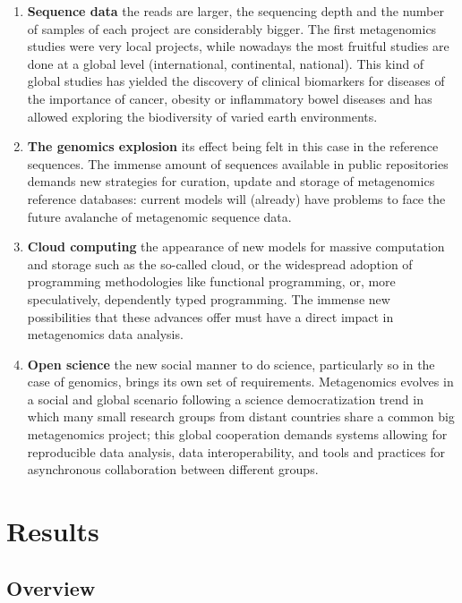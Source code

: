 \documentclass{frontiersSCNS} %
\providecommand{\tightlist}{%
\setlength{\itemsep}{0pt}\setlength{\parskip}{0pt}}
\begin{document}
\begin{enumerate}
\def\labelenumi{\roman{enumi}.}
\tightlist
\item
  \textbf{Sequence data} the reads are larger, the sequencing depth and
  the number of samples of each project are considerably bigger. The
  first metagenomics studies were very local projects, while nowadays
  the most fruitful studies are done at a global level (international,
  continental, national). This kind of global studies has yielded the
  discovery of clinical biomarkers for diseases of the importance of
  cancer, obesity or inflammatory bowel diseases and has allowed
  exploring the biodiversity of varied earth environments.
\item
  \textbf{The genomics explosion} its effect being felt in this case in
  the reference sequences. The immense amount of sequences available in
  public repositories demands new strategies for curation, update and
  storage of metagenomics reference databases: current models will
  (already) have problems to face the future avalanche of metagenomic
  sequence data.
\item
  \textbf{Cloud computing} the appearance of new models for massive
  computation and storage such as the so-called cloud, or the widespread
  adoption of programming methodologies like functional programming, or,
  more speculatively, dependently typed programming. The immense new
  possibilities that these advances offer must have a direct impact in
  metagenomics data analysis.
\item
  \textbf{Open science} the new social manner to do science,
  particularly so in the case of genomics, brings its own set of
  requirements. Metagenomics evolves in a social and global scenario
  following a science democratization trend in which many small research
  groups from distant countries share a common big metagenomics project;
  this global cooperation demands systems allowing for reproducible data
  analysis, data interoperability, and tools and practices for
  asynchronous collaboration between different groups.
\end{enumerate}

\section{Results}\label{results}

\subsection{Overview}\label{overview}
\end{document}
